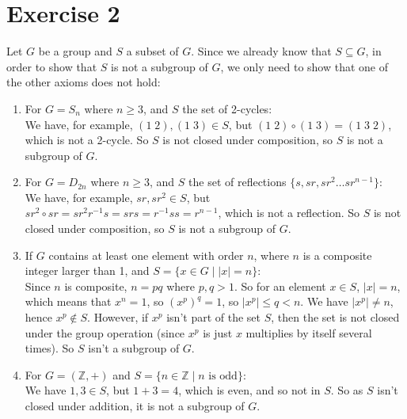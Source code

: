 \documentclass[12pt]{article}
\newcommand{\Z}{\mathbb{Z}}
\begin{document}
    \section*{Exercise 2}
    Let $G$ be a group and $S$ a subset of $G$.
    Since we already know that $S \subseteq G$,
    in order to show that $S$ is not a subgroup of $G$,
    we only need to show that one of the other axioms does not hold: \\
    \begin{enumerate}[label=\textbf{\alph*.}]
        \item 
            For $G = S_n$ where $n \geqslant 3$,
            and $S$ the set of 2-cycles: \\
            We have, for example, $(1\;2), (1\;3) \in S$,
            but $(1\;2) \circ (1\;3) = (1\;3\;2)$, which is not a 2-cycle.
            So $S$ is not closed under composition,
            so $S$ is not a subgroup of $G$.
        \item 
            For $G = D_{2n}$ where $n \geqslant 3$,
            and $S$ the set of reflections $\{s, sr, sr^2 \dots sr^{n-1}\}$: \\
            We have, for example, $sr, sr^2 \in S$,
            but $sr^2 \circ sr = sr^2r^{-1}s = srs = r^{-1}ss = r^{n-1}$,
            which is not a reflection.
            So $S$ is not closed under composition,
            so $S$ is not a subgroup of $G$.
        \item 
            If $G$ contains at least one element with order $n$,
            where $n$ is a composite integer larger than 1,
            and $S = \{x \in G \mid |x| = n\}$: \\
            Since $n$ is composite, $n = pq$ where $p,q > 1$.
            So for an element $x \in S$, $|x| = n$,
            which means that $x^n = 1$,
            so $(x^p)^q = 1$, so $|x^p| \leqslant q < n$.
            We have $|x^p| \neq n$,
            hence $x^p \notin S$.
            However, if $x^p$ isn't part of the set $S$,
            then the set is not closed under the group operation
            (since $x^p$ is just $x$ multiplies by itself several times).
            So $S$ isn't a subgroup of $G$.
        \item 
            For $G = (\Z, +)$
            and $S = \{n \in \Z \mid n \text{ is odd} \}:$ \\
            We have $1, 3 \in S$, but $1 + 3 = 4$, which is even,
            and so not in $S$.
            So as $S$ isn't closed under addition,
            it is not a subgroup of $G$.

\end{enumerate}
\end{document}
